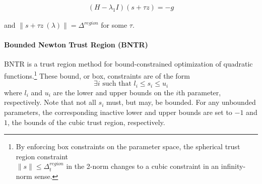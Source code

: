 \begin{align}
    \left(H-\lambda_1 I\right)(s+\tau z)=-g
    \label{eq:hard-case}
\end{align}

and $ \lVert s +\tau z \ (\lambda) \rVert  = \Delta^{region}  $ for some $\tau$.





\paragraph{Bounded Newton Trust Region (BNTR)}

BNTR is a trust region method for bound-constrained optimization of quadratic functions.\footnote{By enforcing box constraints on the parameter space, the spherical trust region constraint \\
$\lVert s \rVert \leq \Delta^{region}_{t}$ in the 2-norm changes to a cubic constraint in an infinity-norm sense.}
These bound, or box, constraints are of the form 
$$\exists i \text{ such that } l_i \leq s_i \leq u_i$$
where $l_i$ and $u_i$ are the lower and upper bounds on the $i$th parameter, respectively. 
Note that not all $s_i$ must, but may, be bounded. For any unbounded parameters, the corresponding inactive lower and upper bounds are set to $-1$ and $1$, the bounds of the cubic trust region, respectively. 


